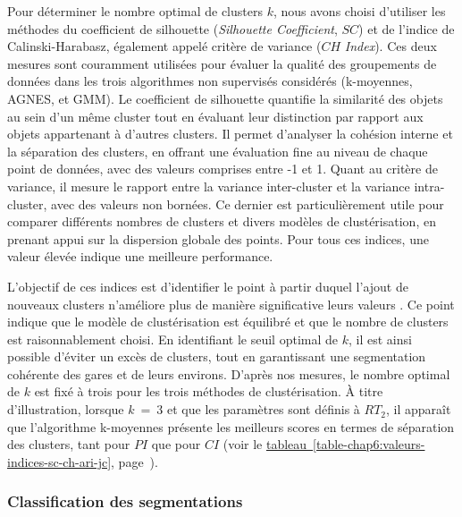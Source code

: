 \begin{refsegment}
Pour déterminer le nombre optimal de clusters \(k\), nous avons choisi d'utiliser les méthodes du coefficient de silhouette (\textsl{Silhouette Coefficient}, \(SC\)) et de l'indice de Calinski-Harabasz, également appelé critère de variance (\(CH\) \textsl{Index}). Ces deux mesures sont couramment utilisées pour évaluer la qualité des groupements de données dans les trois algorithmes non supervisés considérés (k-moyennes, \acrshort{AGNES}, et \acrshort{GMM}). Le coefficient de silhouette quantifie la similarité des objets au sein d'un même cluster tout en évaluant leur distinction par rapport aux objets appartenant à d'autres clusters. Il permet d'analyser la cohésion interne et la séparation des clusters, en offrant une évaluation fine au niveau de chaque point de données, avec des valeurs comprises entre -1 et 1. Quant au critère de variance, il mesure le rapport entre la variance inter-cluster et la variance intra-cluster, avec des valeurs non bornées. Ce dernier est particulièrement utile pour comparer différents nombres de clusters et divers modèles de clustérisation, en prenant appui sur la dispersion globale des points. Pour tous ces indices, une valeur élevée indique une meilleure performance.%

L'objectif de ces indices est d'identifier le point à partir duquel l'ajout de nouveaux clusters n'améliore plus de manière significative leurs valeurs \textcolor{blue}{\autocite[23]{jahaniana_selecting_2022}}. Ce point indique que le modèle de clustérisation est équilibré et que le nombre de clusters est raisonnablement choisi. En identifiant le seuil optimal de \(k\), il est ainsi possible d'éviter un excès de clusters, tout en garantissant une segmentation cohérente des gares et de leurs environs. D'après nos mesures, le nombre optimal de \(k\) est fixé à trois pour les trois méthodes de clustérisation. À titre d’illustration, lorsque \(k~=~3\) et que les paramètres sont définis à \(RT_{2}\), il apparaît que l'algorithme k-moyennes présente les meilleurs scores en termes de séparation des clusters, tant pour \(PI\) que pour \(CI\) (voir le \hyperref[table-chap6:valeurs-indices-sc-ch-ari-jc]{tableau~\ref{table-chap6:valeurs-indices-sc-ch-ari-jc}}, page~\pageref{table-chap6:valeurs-indices-sc-ch-ari-jc}).%

\subsubsection*{Classification des segmentations
    \label{chap6:methodologie-statistiques-classification}
    }


\end{refsegment}
